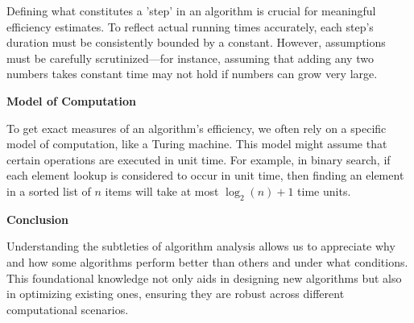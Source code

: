 \documentclass[12pt]{book} %
\begin{document}
Defining what constitutes a 'step' in an algorithm is crucial for meaningful efficiency estimates. To reflect actual running times accurately, each step’s duration must be consistently bounded by a constant. However, assumptions must be carefully scrutinized—for instance, assuming that adding any two numbers takes constant time may not hold if numbers can grow very large.

\textbf{Model of Computation}

To get exact measures of an algorithm’s efficiency, we often rely on a specific model of computation, like a Turing machine. This model might assume that certain operations are executed in unit time. For example, in binary search, if each element lookup is considered to occur in unit time, then finding an element in a sorted list of \(n\) items will take at most \(\log_2(n) + 1\) time units.

\textbf{Conclusion}

Understanding the subtleties of algorithm analysis allows us to appreciate why and how some algorithms perform better than others and under what conditions. This foundational knowledge not only aids in designing new algorithms but also in optimizing existing ones, ensuring they are robust across different computational scenarios.
\end{document}
